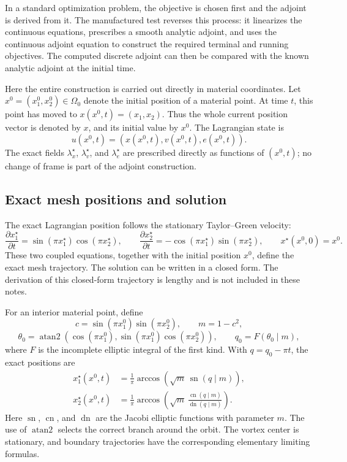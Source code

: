 \documentclass[11pt]{article}
\begin{document}
In a standard optimization problem, the objective is chosen first and the
adjoint is derived from it.  The manufactured test reverses this process: it
linearizes the continuous equations, prescribes a smooth analytic adjoint,
and uses the continuous adjoint equation to construct the required terminal
and running objectives.  The computed discrete adjoint can then be compared
with the known analytic adjoint at the initial time.

Here the entire construction is carried out directly in material
coordinates.  Let
$x^0=(x_1^0,x_2^0)\in\Omega_0$ denote the initial position of a material
point.  At time $t$, this point has moved to
$x(x^0,t)=(x_1,x_2)$.  Thus the whole current position vector is denoted by
$x$, and its initial value by $x^0$.  The Lagrangian state is
\[
 u(x^0,t)=(x(x^0,t),v(x^0,t),e(x^0,t)).
\]
The exact fields
$\lambda_x^\star$, $\lambda_v^\star$, and
$\lambda_e^\star$ are prescribed directly as functions of $(x^0,t)$; no
change of frame is part of the adjoint construction.

\subsection{Exact mesh positions and solution}

The exact Lagrangian position follows the stationary Taylor--Green velocity:
\[
 \frac{\partial x_1^\star}{\partial t}
 =\sin(\pi x_1^\star)\cos(\pi x_2^\star),
 \qquad
 \frac{\partial x_2^\star}{\partial t}
 =-\cos(\pi x_1^\star)\sin(\pi x_2^\star),
 \qquad x^\star(x^0,0)=x^0.
\]
These two coupled equations, together with the initial position $x^0$,
define the exact mesh trajectory.
The solution can be written in a closed form.
The derivation of this closed-form trajectory is lengthy and is not included
in these notes.

For an interior material point, define
\[
 c=\sin(\pi x_1^0)\sin(\pi x_2^0),\qquad m=1-c^2,
\]
\[
 \theta_0=\operatorname{atan2}\!\left(
 \cos(\pi x_1^0),
 \sin(\pi x_1^0)\cos(\pi x_2^0)\right),
 \qquad q_0=F(\theta_0\mid m),
\]
where $F$ is the incomplete elliptic integral of the first kind.  With
$q=q_0-\pi t$, the exact positions are
\begin{equation}
 \boxed{
 \begin{aligned}
 x_1^\star(x^0,t)
 &=\frac{1}{\pi}\arccos\!\left(
 \sqrt m\,\operatorname{sn}(q\mid m)\right),\\
 x_2^\star(x^0,t)
 &=\frac{1}{\pi}\arccos\!\left(
 \sqrt m\,\frac{\operatorname{cn}(q\mid m)}
 {\operatorname{dn}(q\mid m)}\right).
 \end{aligned}}
 \label{eq:exact-lagrangian-flow-map}
\end{equation}
Here $\operatorname{sn}$, $\operatorname{cn}$, and $\operatorname{dn}$ are
the Jacobi elliptic functions with parameter $m$.  The use of
$\operatorname{atan2}$ selects the correct branch around the orbit.  The
vortex center is stationary, and boundary trajectories have the
corresponding elementary limiting formulas.
\end{document}
